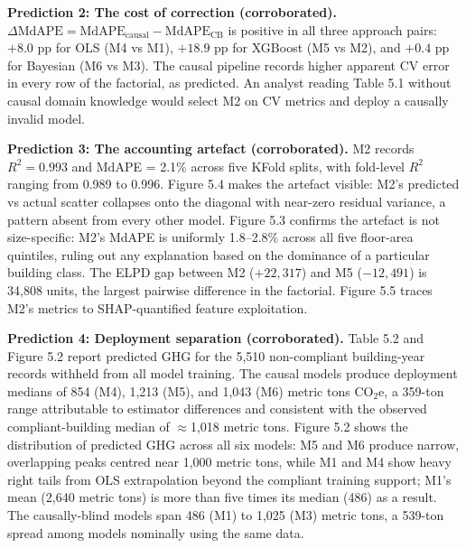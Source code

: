 \textbf{Prediction 2: The cost of correction (corroborated).} $\Delta\text{MdAPE} = \text{MdAPE}_{\text{causal}} - \text{MdAPE}_{\text{CB}}$ is positive in all three approach pairs: $+8.0$ pp for OLS (M4 vs M1), $+18.9$ pp for XGBoost (M5 vs M2), and $+0.4$ pp for Bayesian (M6 vs M3). The causal pipeline records higher apparent CV error in every row of the factorial, as predicted. An analyst reading Table 5.1 without causal domain knowledge would select M2 on CV metrics and deploy a causally invalid model.

\textbf{Prediction 3: The accounting artefact (corroborated).} M2 records $R^2 = 0.993$ and MdAPE = 2.1\% across five KFold splits, with fold-level $R^2$ ranging from 0.989 to 0.996. Figure 5.4 makes the artefact visible: M2's predicted vs actual scatter collapses onto the diagonal with near-zero residual variance, a pattern absent from every other model. Figure 5.3 confirms the artefact is not size-specific: M2's MdAPE is uniformly 1.8--2.8\% across all five floor-area quintiles, ruling out any explanation based on the dominance of a particular building class. The ELPD gap between M2 ($+22{,}317$) and M5 ($-12{,}491$) is 34,808 units, the largest pairwise difference in the factorial. Figure 5.5 traces M2's metrics to SHAP-quantified feature exploitation.

\textbf{Prediction 4: Deployment separation (corroborated).} Table 5.2 and Figure 5.2 report predicted GHG for the 5,510 non-compliant building-year records withheld from all model training. The causal models produce deployment medians of 854 (M4), 1,213 (M5), and 1,043 (M6) metric tons CO$_2$e, a 359-ton range attributable to estimator differences and consistent with the observed compliant-building median of $\approx$1,018 metric tons. Figure 5.2 shows the distribution of predicted GHG across all six models: M5 and M6 produce narrow, overlapping peaks centred near 1,000 metric tons, while M1 and M4 show heavy right tails from OLS extrapolation beyond the compliant training support; M1's mean (2,640 metric tons) is more than five times its median (486) as a result. The causally-blind models span 486 (M1) to 1,025 (M3) metric tons, a 539-ton spread among models nominally using the same data.

